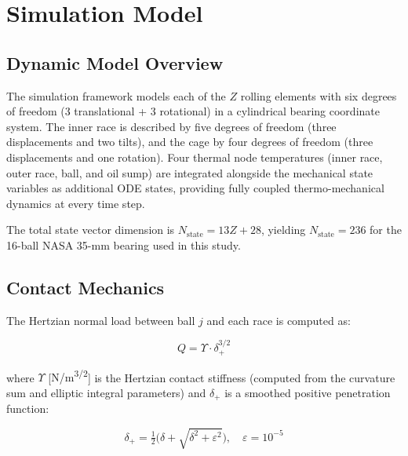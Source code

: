 \documentclass[applsci,article,submit,pdftex,moreauthors]{Definitions/mdpi}
\begin{document}
\section{Simulation Model}
\label{sec:model}

\subsection{Dynamic Model Overview}
\label{sec:overview}

The simulation framework models each of the $Z$ rolling elements with six degrees of freedom (3 translational + 3 rotational) in a cylindrical bearing coordinate system. The inner race is described by five degrees of freedom (three displacements and two tilts), and the cage by four degrees of freedom (three displacements and one rotation). Four thermal node temperatures (inner race, outer race, ball, and oil sump) are integrated alongside the mechanical state variables as additional ODE states, providing fully coupled thermo-mechanical dynamics at every time step.

The total state vector dimension is $N_{\text{state}} = 13Z + 28$, yielding $N_{\text{state}} = 236$ for the 16-ball NASA 35-mm bearing used in this study.

\subsection{Contact Mechanics}

The Hertzian normal load between ball $j$ and each race is computed as:

\begin{linenomath}
\begin{equation}
    Q = \Upsilon \cdot \delta_+^{3/2}
    \label{eq:hertz}
\end{equation}
\end{linenomath}

where $\Upsilon$ [{\si{N/m^{3/2}}}] is the Hertzian contact stiffness (computed from the curvature sum and elliptic integral parameters) and $\delta_+$ is a smoothed positive penetration function:

\begin{linenomath}
\begin{equation}
    \delta_+ = \tfrac{1}{2}\bigl(\delta + \sqrt{\delta^2 + \varepsilon^2}\bigr), \quad \varepsilon = 10^{-5}
    \label{eq:smooth}
\end{equation}
\end{linenomath}
\end{document}
